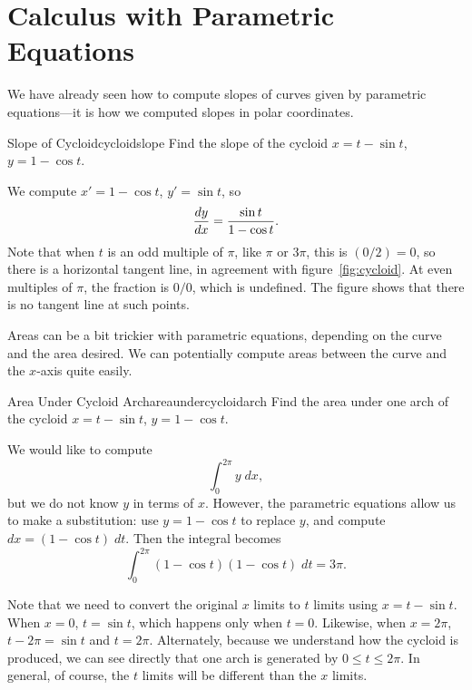\section{Calculus with Parametric Equations}\label{sec:Calculus with Parametric Equations}
We have already seen how to compute slopes of curves given by
parametric equations---it is how we computed slopes in polar
coordinates.

\begin{example}{Slope of Cycloid}{cycloidslope}
 Find the slope of the cycloid $x=t-\sin t$, $y=1-\cos t$.
\end{example}

\begin{solution}
We compute $x'=1-\cos t$, $y'=\sin t$, so 
$${dy\over dx} ={\sin t\over  1-\cos t}.$$
Note that when $t$ is an odd multiple of $\pi$, like $\pi$ or $3\pi$,
this is $(0/2)=0$, so there is a horizontal tangent line, in agreement
with figure~\ref{fig:cycloid}. At even multiples of $\pi$, the
fraction is $0/0$, which is undefined. The figure shows that
there is no tangent line at such points.
\end{solution}

Areas can be a bit trickier with parametric equations, depending on
the curve and the area desired. We can potentially compute areas
between the curve and the $x$-axis quite easily.

\begin{example}{Area Under Cycloid Arch}{areaundercycloidarch}
 Find the area under one arch of the cycloid
$x=t-\sin t$, $y=1-\cos t$. 
\end{example}

\begin{solution}
We would like to compute
$$\int_0^{2\pi} y\;dx,$$
but we do not know $y$ in terms of $x$. However, the parametric
equations allow us to make a substitution: use $y=1-\cos t$
to replace $y$, and compute $dx=(1-\cos t)\;dt$. Then the integral
becomes 
$$\int_0^{2\pi} (1-\cos t)(1-\cos t)\;dt=3\pi.$$

Note that we need to convert the original $x$ limits to $t$ limits
using $x=t-\sin t$. When $x=0$, $t=\sin t$, which happens only when
$t=0$. Likewise, when $x=2\pi$, $t-2\pi=\sin t$ and
$t=2\pi$. Alternately, because we understand how the cycloid is
produced, we can see directly that one arch is generated by 
$0\le t\le 2\pi$. In general, of course, the $t$ limits will be
different than the $x$ limits.
\end{solution}

